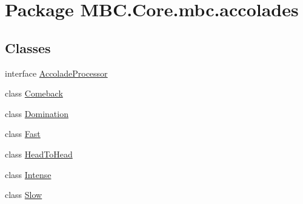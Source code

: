 \hypertarget{namespace_m_b_c_1_1_core_1_1mbc_1_1accolades}{\section{Package M\-B\-C.\-Core.\-mbc.\-accolades}
\label{namespace_m_b_c_1_1_core_1_1mbc_1_1accolades}
}
\subsection*{Classes}
\begin{DoxyCompactItemize}
\item 
interface \hyperlink{interface_m_b_c_1_1_core_1_1mbc_1_1accolades_1_1_accolade_processor}{Accolade\-Processor}
\item 
class \hyperlink{class_m_b_c_1_1_core_1_1mbc_1_1accolades_1_1_comeback}{Comeback}
\item 
class \hyperlink{class_m_b_c_1_1_core_1_1mbc_1_1accolades_1_1_domination}{Domination}
\item 
class \hyperlink{class_m_b_c_1_1_core_1_1mbc_1_1accolades_1_1_fast}{Fast}
\item 
class \hyperlink{class_m_b_c_1_1_core_1_1mbc_1_1accolades_1_1_head_to_head}{Head\-To\-Head}
\item 
class \hyperlink{class_m_b_c_1_1_core_1_1mbc_1_1accolades_1_1_intense}{Intense}
\item 
class \hyperlink{class_m_b_c_1_1_core_1_1mbc_1_1accolades_1_1_slow}{Slow}
\end{DoxyCompactItemize}
